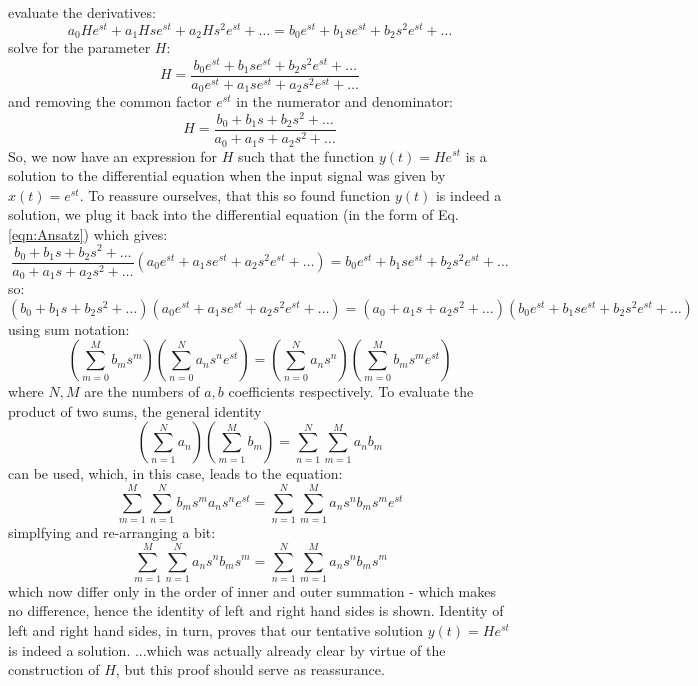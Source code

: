 evaluate the derivatives:
\begin{equation}
\label{eqn:Ansatz}
 a_0 H e^{st} + a_1 H s e^{st} + a_2 H s^2 e^{st} + \ldots = b_0 e^{st} + b_1 s e^{st} + b_2 s^2 e^{st} + \ldots 
\end{equation} 
solve for the parameter $H$:
\begin{equation}
 H = \frac{b_0 e^{st} + b_1 s e^{st} + b_2 s^2 e^{st} + \ldots}{a_0 e^{st} + a_1 s e^{st} + a_2 s^2 e^{st} + \ldots}
\end{equation} 
and removing the common factor $e^{st}$ in the numerator and denominator:
\begin{equation}
 H = \frac{b_0 + b_1 s + b_2 s^2 + \ldots}{a_0 + a_1 s + a_2 s^2 + \ldots}
\end{equation} 
So, we now have an expression for $H$ such that the function $y(t) = H e^{st}$ is a solution to the differential equation when the input signal was given by $x(t) = e^{st}$. To reassure ourselves, that this so found function $y(t)$ is indeed a solution, we plug it back into the differential equation (in the form of Eq. \ref{eqn:Ansatz}) which gives:
\begin{equation}
 \frac{b_0 + b_1 s + b_2 s^2 + \ldots}{a_0 + a_1 s + a_2 s^2 + \ldots} (a_0 e^{st} + a_1 s e^{st} + a_2 s^2 e^{st} + \ldots)
 = b_0 e^{st} + b_1 s e^{st} + b_2 s^2 e^{st} + \ldots 
\end{equation} 
so:
\begin{equation}
   (b_0 + b_1 s + b_2 s^2 + \ldots) (a_0 e^{st} + a_1 s e^{st} + a_2 s^2 e^{st} + \ldots)
 = (a_0 + a_1 s + a_2 s^2 + \ldots) (b_0 e^{st} + b_1 s e^{st} + b_2 s^2 e^{st} + \ldots)
\end{equation} 
using sum notation:
\begin{equation}
   \left( \sum_{m=0}^M b_m s^m \right) \left( \sum_{n=0}^N a_n s^n e^{st} \right) 
 = \left( \sum_{n=0}^N a_n s^n \right) \left( \sum_{m=0}^M b_m s^m e^{st} \right) 
\end{equation} 
where $N, M$ are the numbers of $a, b$ coefficients respectively. To evaluate the product of two sums, the general identity
\begin{equation}
 \left( \sum_{n=1}^N a_n \right) \left( \sum_{m=1}^M b_m \right) 
 = \sum_{n=1}^N \sum_{m=1}^M a_n b_m
\end{equation}
can be used, which, in this case, leads to the equation:
\begin{equation}
 \sum_{m=1}^M \sum_{n=1}^N b_m s^m a_n s^n e^{st} = \sum_{n=1}^N \sum_{m=1}^M a_n s^n b_m s^m e^{st}
\end{equation}
simplfying and re-arranging a bit:
\begin{equation}
 \sum_{m=1}^M \sum_{n=1}^N a_n s^n b_m s^m = \sum_{n=1}^N \sum_{m=1}^M a_n s^n b_m s^m 
\end{equation}
which now differ only in the order of inner and outer summation - which makes no difference, hence the identity of left and right hand sides is shown. Identity of left and right hand sides, in turn, proves that our tentative solution $y(t) = H e^{st}$ is indeed a solution. ...which was actually already clear by virtue of the construction of $H$, but this proof should serve as reassurance.

